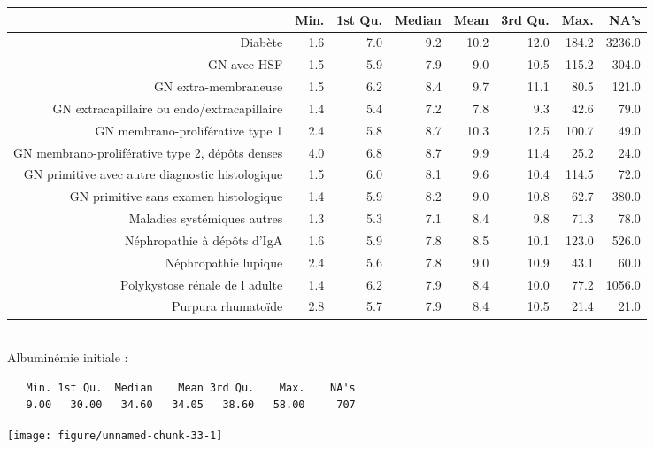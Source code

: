 \documentclass[11pt,a4paper]{article}\usepackage[]{graphicx}\usepackage[]{color}
\makeatletter
\def\maxwidth{ %
  \ifdim\Gin@nat@width>\linewidth
    \linewidth
  \else
    \Gin@nat@width
  \fi
}
\newenvironment{kframe}{%
 \def\at@end@of@kframe{}%
 \ifinner\ifhmode%
  \def\at@end@of@kframe{\end{minipage}}%
  \begin{minipage}{\columnwidth}%
 \fi\fi%
 \def\FrameCommand##1{\hskip\@totalleftmargin \hskip-\fboxsep
 \colorbox{shadecolor}{##1}\hskip-\fboxsep
     \hskip-\linewidth \hskip-\@totalleftmargin \hskip\columnwidth}%
 \MakeFramed {\advance\hsize-\width
   \@totalleftmargin\z@ \linewidth\hsize
   \@setminipage}}%
 {\par\unskip\endMakeFramed%
 \at@end@of@kframe}
\newenvironment{knitrout}{}{} %
\makeatother
\begin{document}
\begin{table}[ht]
\centering
\begingroup\small
\begin{tabular}{rrrrrrrr}
  \hline
 & Min. & 1st Qu. & Median & Mean & 3rd Qu. & Max. & NA's \\ 
  \hline
Diabète & 1.6 & 7.0 & 9.2 & 10.2 & 12.0 & 184.2 & 3236.0 \\ 
  GN avec HSF & 1.5 & 5.9 & 7.9 & 9.0 & 10.5 & 115.2 & 304.0 \\ 
  GN extra-membraneuse & 1.5 & 6.2 & 8.4 & 9.7 & 11.1 & 80.5 & 121.0 \\ 
  GN extracapillaire ou endo/extracapillaire & 1.4 & 5.4 & 7.2 & 7.8 & 9.3 & 42.6 & 79.0 \\ 
  GN membrano-proliférative type 1 & 2.4 & 5.8 & 8.7 & 10.3 & 12.5 & 100.7 & 49.0 \\ 
  GN membrano-proliférative type 2, dépôts denses & 4.0 & 6.8 & 8.7 & 9.9 & 11.4 & 25.2 & 24.0 \\ 
  GN primitive avec autre diagnostic histologique & 1.5 & 6.0 & 8.1 & 9.6 & 10.4 & 114.5 & 72.0 \\ 
  GN primitive sans examen histologique & 1.4 & 5.9 & 8.2 & 9.0 & 10.8 & 62.7 & 380.0 \\ 
  Maladies systémiques autres & 1.3 & 5.3 & 7.1 & 8.4 & 9.8 & 71.3 & 78.0 \\ 
  Néphropathie à dépôts d'IgA & 1.6 & 5.9 & 7.8 & 8.5 & 10.1 & 123.0 & 526.0 \\ 
  Néphropathie lupique & 2.4 & 5.6 & 7.8 & 9.0 & 10.9 & 43.1 & 60.0 \\ 
  Polykystose rénale de l adulte & 1.4 & 6.2 & 7.9 & 8.4 & 10.0 & 77.2 & 1056.0 \\ 
  Purpura rhumatoïde & 2.8 & 5.7 & 7.9 & 8.4 & 10.5 & 21.4 & 21.0 \\ 
   \hline
\end{tabular}
\endgroup
\end{table}


~\\

Albuminémie initiale :


\begin{knitrout}
\color{fgcolor}\begin{kframe}
\begin{verbatim}
   Min. 1st Qu.  Median    Mean 3rd Qu.    Max.    NA's 
   9.00   30.00   34.60   34.05   38.60   58.00     707 
\end{verbatim}
\end{kframe}
\texttt{[image: figure/unnamed-chunk-33-1]} 

\end{knitrout}
\end{document}
